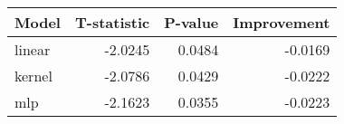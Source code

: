 \begin{tabular}{lrrr}
\toprule
Model & T-statistic & P-value & Improvement \\
\midrule
linear & -2.0245 & 0.0484 & -0.0169 \\
kernel & -2.0786 & 0.0429 & -0.0222 \\
mlp & -2.1623 & 0.0355 & -0.0223 \\
\bottomrule
\end{tabular}
